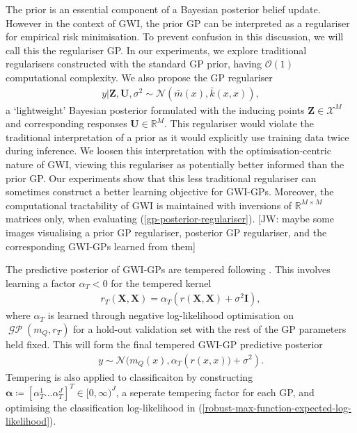 \documentclass{article}
\newcommand{\jw}[1]{{\color{gray} [JW: #1]}}
\newcommand{\GP}{\operatorname{\mathcal{GP}}}
\numberwithin{equation}{section}
\begin{document}
The prior is an essential component of a Bayesian posterior belief update. 
However in the context of GWI, the prior GP can be interpreted as a regulariser for empirical risk minimisation. 
To prevent confusion in this discussion, we will call this the regulariser GP. In our experiments, we explore traditional regularisers constructed with the standard GP prior, having $\mathcal{O}(1)$ computational complexity. We also propose the GP regulariser
\begin{align}
    y \vert \mathbf{Z}, \mathbf{U}, \sigma^2 
    \sim \mathcal{N}\left(\bar{m}(x), \bar{k}(x, x)\right),
    \label{gp-posterior-regulariser}
\end{align}
a `lightweight' Bayesian posterior formulated with the inducing points $\mathbf{Z}\in \mathcal{X}^M$ and corresponding responses $\mathbf{U} \in \mathbb{R}^M$.
This regulariser would violate the traditional interpretation of a prior as it would explicitly use training data twice during inference.
We loosen this interpretation with the optimisation-centric nature of GWI, viewing this regulariser as potentially better informed than the prior GP.
Our experiments show that this less traditional regulariser can sometimes construct a better learning objective for GWI-GPs.
Moreover, the computational tractability of GWI is maintained with inversions of $\mathbb{R}^{M\times M}$ matrices only, when evaluating (\ref{gp-posterior-regulariser}).
\jw{maybe some images visualising a prior GP regulariser, posterior GP regulariser, and the corresponding GWI-GPs learned from them}

The predictive posterior of GWI-GPs are tempered following \cite{wild2022generalized}. This involves learning a factor $\alpha_T < 0$ for the tempered kernel
\begin{align}
    r_T(\mathbf{X}, \mathbf{X}) = \alpha_T \left(r(\mathbf{X}, \mathbf{X})+\sigma^2 \mathbf{I}\right),
\end{align}
where $\alpha_T$ is learned through negative log-likelihood optimisation on $\GP(m_Q, r_T)$ for a hold-out validation set with the rest of the GP parameters held fixed. This will form the final tempered GWI-GP predictive posterior
\begin{align}
    y \sim \mathcal{N}(m_Q(x), \alpha_T \left( r(x, x)) + \sigma^2\right).
\end{align}
Tempering is also applied to classificaiton by constructing $\boldsymbol{\alpha} \coloneqq \left[\alpha_T^1 \dots \alpha_T^J\right]^T \in [0, \infty)^J$, a seperate tempering factor for each GP, and optimising the classification log-likelihood in (\ref{robust-max-function-expected-log-likelihood}).
\end{document}
